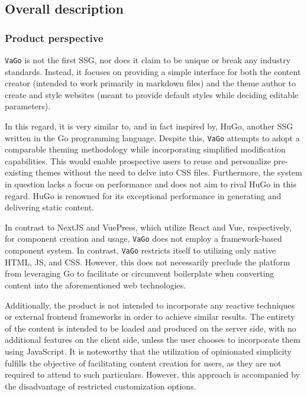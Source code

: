 
\subsection{Overall description}\label{subsec:overall-description}

\subsubsection{Product perspective}\label{subsubsec:product-perspective}

\texttt{VaGo} is not the first SSG, nor does it claim to be unique or
break any industry standards. Instead, it focuses on providing a simple
interface for both the content creator (intended to work primarily in
markdown files) and the theme author to create and style websites (meant
to provide default styles while deciding editable parameters).

In this regard, it is very similar to, and in fact inspired by,
HuGo\cite{hugo}\cite{wikihugo}, another SSG written in the Go programming language.
Despite this, \texttt{VaGo} attempts to adopt a comparable theming
methodology while incorporating simplified modification capabilities.
This would enable prospective users to reuse and personalize
pre-existing themes without the need to delve into CSS files.
Furthermore, the system in question lacks a focus on performance and
does not aim to rival HuGo in this regard. HuGo is renowned for its
exceptional performance in generating and delivering static content.

In contrast to NextJS and VuePress\cite{vuepress}, which utilize React and Vue,
respectively, for component creation and usage, \texttt{VaGo} does not
employ a framework-based component system. In contrast, \texttt{VaGo}
restricts itself to utilizing only native HTML, JS, and CSS. However,
this does not necessarily preclude the platform from leveraging Go to
facilitate or circumvent boilerplate when converting content into the
aforementioned web technologies.

Additionally, the product is not intended to incorporate any reactive
techniques or external frontend frameworks in order to achieve similar
results. The entirety of the content is intended to be loaded and
produced on the server side\cite{sunssr}, with no additional features on the client
side, unless the user chooses to incorporate them using JavaScript. It
is noteworthy that the utilization of opinionated simplicity fulfills
the objective of facilitating content creation for users, as they are
not required to attend to such particulars. However, this approach is
accompanied by the disadvantage of restricted customization options.

